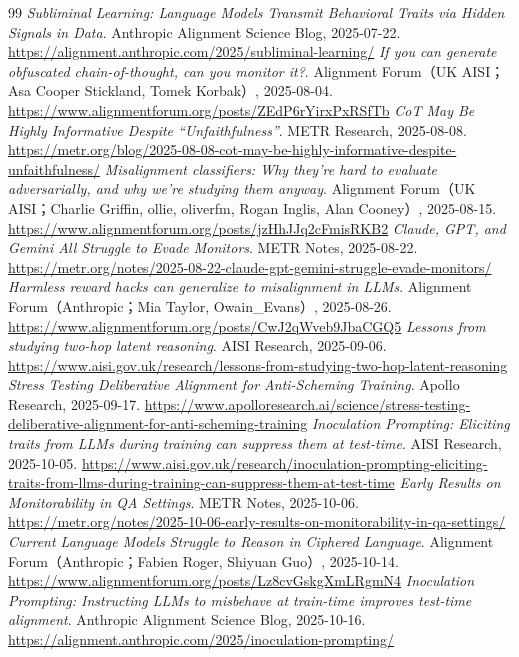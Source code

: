 \begin{thebibliography}{99}
 \textit{Subliminal Learning: Language Models Transmit Behavioral Traits via Hidden Signals in Data}. Anthropic Alignment Science Blog, 2025-07-22. \url{https://alignment.anthropic.com/2025/subliminal-learning/}
 \textit{If you can generate obfuscated chain-of-thought, can you monitor it?}. Alignment Forum（UK AISI；Asa Cooper Stickland, Tomek Korbak）, 2025-08-04. \url{https://www.alignmentforum.org/posts/ZEdP6rYirxPxRSfTb}
 \textit{CoT May Be Highly Informative Despite “Unfaithfulness”}. METR Research, 2025-08-08. \url{https://metr.org/blog/2025-08-08-cot-may-be-highly-informative-despite-unfaithfulness/}
 \textit{Misalignment classifiers: Why they’re hard to evaluate adversarially, and why we're studying them anyway}. Alignment Forum（UK AISI；Charlie Griffin, ollie, oliverfm, Rogan Inglis, Alan Cooney）, 2025-08-15. \url{https://www.alignmentforum.org/posts/jzHhJJq2cFmisRKB2}
 \textit{Claude, GPT, and Gemini All Struggle to Evade Monitors}. METR Notes, 2025-08-22. \url{https://metr.org/notes/2025-08-22-claude-gpt-gemini-struggle-evade-monitors/}
 \textit{Harmless reward hacks can generalize to misalignment in LLMs}. Alignment Forum（Anthropic；Mia Taylor, Owain\_Evans）, 2025-08-26. \url{https://www.alignmentforum.org/posts/CwJ2qWveb9JbaCGQ5}
 \textit{Lessons from studying two-hop latent reasoning}. AISI Research, 2025-09-06. \url{https://www.aisi.gov.uk/research/lessons-from-studying-two-hop-latent-reasoning}
 \textit{Stress Testing Deliberative Alignment for Anti-Scheming Training}. Apollo Research, 2025-09-17. \url{https://www.apolloresearch.ai/science/stress-testing-deliberative-alignment-for-anti-scheming-training}
 \textit{Inoculation Prompting: Eliciting traits from LLMs during training can suppress them at test-time}. AISI Research, 2025-10-05. \url{https://www.aisi.gov.uk/research/inoculation-prompting-eliciting-traits-from-llms-during-training-can-suppress-them-at-test-time}
 \textit{Early Results on Monitorability in QA Settings}. METR Notes, 2025-10-06. \url{https://metr.org/notes/2025-10-06-early-results-on-monitorability-in-qa-settings/}
 \textit{Current Language Models Struggle to Reason in Ciphered Language}. Alignment Forum（Anthropic；Fabien Roger, Shiyuan Guo）, 2025-10-14. \url{https://www.alignmentforum.org/posts/Lz8cvGskgXmLRgmN4}
 \textit{Inoculation Prompting: Instructing LLMs to misbehave at train-time improves test-time alignment}. Anthropic Alignment Science Blog, 2025-10-16. \url{https://alignment.anthropic.com/2025/inoculation-prompting/}

\end{thebibliography}
